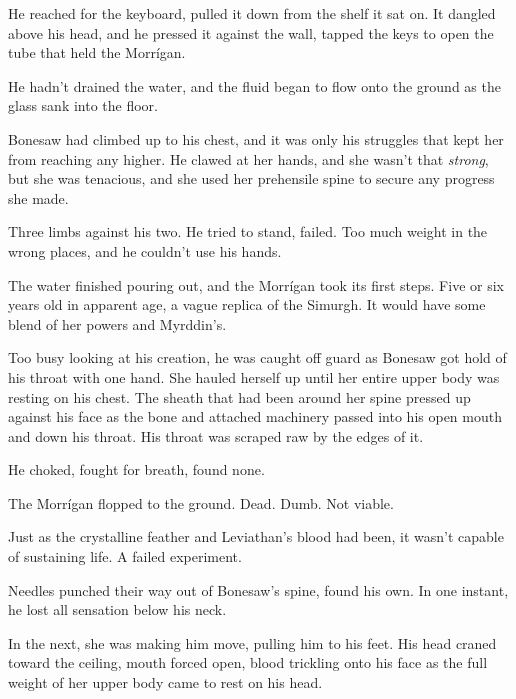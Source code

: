 He reached for the keyboard, pulled it down from the shelf it sat on.  It dangled above his head, and he pressed it against the wall, tapped the keys to open the tube that held the Morr\'{i}gan.



He hadn't drained the water, and the fluid began to flow onto the ground as the glass sank into the floor.



Bonesaw had climbed up to his chest, and it was only his struggles that kept her from reaching any higher.  He clawed at her hands, and she wasn't that \emph{strong}, but she was tenacious, and she used her prehensile spine to secure any progress she made.



Three limbs against his two.  He tried to stand, failed.  Too much weight in the wrong places, and he couldn't use his hands.



The water finished pouring out, and the Morr\'{i}gan took its first steps.  Five or six years old in apparent age, a vague replica of the Simurgh.  It would have some blend of her powers and Myrddin's.



Too busy looking at his creation, he was caught off guard as Bonesaw got hold of his throat with one hand.  She hauled herself up until her entire upper body was resting on his chest.  The sheath that had been around her spine pressed up against his face as the bone and attached machinery passed into his open mouth and down his throat.  His throat was scraped raw by the edges of it.



He choked, fought for breath, found none.



The Morr\'{i}gan flopped to the ground.  Dead.  Dumb.  Not viable.



Just as the crystalline feather and Leviathan's blood had been, it wasn't capable of sustaining life.  A failed experiment.



Needles punched their way out of Bonesaw's spine, found his own.  In one instant, he lost all sensation below his neck.



In the next, she was making him move, pulling him to his feet.  His head craned toward the ceiling, mouth forced open, blood trickling onto his face as the full weight of her upper body came to rest on his head.



